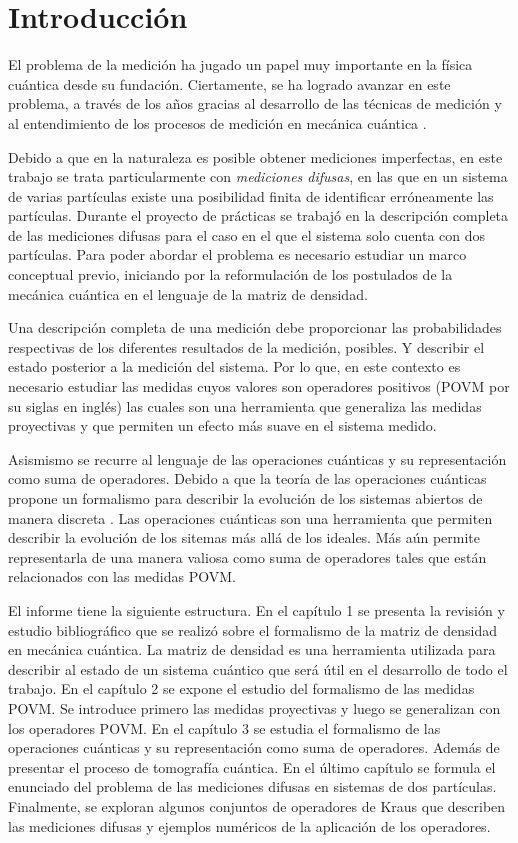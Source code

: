 \chapter*{Introducción}

El problema de la medición ha jugado un papel muy importante en la física cuántica desde su fundación. Ciertamente, se ha logrado avanzar en este problema, a través de los años gracias al desarrollo de las técnicas de medición y al entendimiento de los procesos de medición en mecánica cuántica {\cite{Pineda_2021}}. 

Debido a que en la naturaleza es posible obtener  mediciones imperfectas, en este trabajo se trata particularmente con \textit{mediciones difusas}, en las que en un sistema de varias partículas existe una posibilidad finita de identificar erróneamente las partículas. Durante el proyecto de prácticas se trabajó en la descripción completa de las mediciones difusas para el caso en el que el sistema solo cuenta con dos partículas. Para poder abordar el problema es necesario estudiar un marco conceptual previo, iniciando por la reformulación de los postulados de la mecánica cuántica en el lenguaje de la matriz de densidad.

Una descripción completa de una medición debe proporcionar las probabilidades respectivas de los diferentes resultados de la medición, posibles. Y describir el estado posterior a la medición del sistema. Por lo que, en este contexto es necesario estudiar las medidas cuyos valores son operadores positivos (POVM por su siglas en inglés) las cuales son una herramienta que generaliza las medidas proyectivas y que permiten un efecto más suave en el sistema medido.  

Asismismo se recurre al lenguaje de las operaciones cuánticas y su representación como  suma de operadores. Debido a que la teoría de las operaciones cuánticas propone un formalismo para describir la evolución de los sistemas abiertos de manera discreta {\cite{nielsen_chuang_2010}}. Las operaciones cuánticas son una herramienta que permiten describir la evolución de los sitemas más allá de los ideales. Más aún permite representarla de una manera valiosa como suma de operadores tales que están relacionados con las medidas POVM\@.

El informe tiene la siguiente estructura.  En el capítulo 1 se presenta la revisión y estudio bibliográfico que se realizó sobre el formalismo de la matriz de densidad en mecánica cuántica. La matriz de densidad es una herramienta utilizada para describir al estado de un sistema cuántico que será útil en el desarrollo de todo el trabajo. En el capítulo 2 se expone el estudio del formalismo de las medidas POVM\@. Se introduce primero las medidas proyectivas y luego se generalizan con los operadores POVM\@. En el capítulo 3 se estudia el formalismo de las operaciones cuánticas y su representación como suma de operadores. Además de presentar el proceso de tomografía cuántica. En el último capítulo se formula el enunciado del problema de las mediciones difusas en sistemas de dos partículas. Finalmente, se exploran algunos conjuntos de operadores de Kraus que describen las mediciones difusas y ejemplos numéricos de la aplicación de los operadores. 